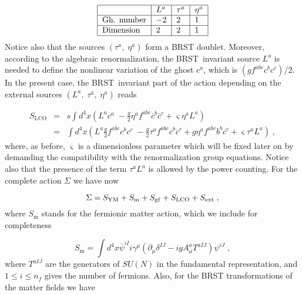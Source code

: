 \documentclass[a4paper,12pt]{article}
\begin{document}
\begin{equation}
\begin{tabular}{|l|l|l|l|}
\hline
& $L^{a}$ & $\tau ^{a}$ & $\eta ^{a}$ \\ \hline
Gh. number & $-2$ & $2$ & $1$ \\ \hline
Dimension & $2$ & $2$ & $1$ \\ \hline
\end{tabular}
\label{qltn}
\end{equation}
Notice also that the sources $\left( \tau ^{a},\;\eta ^{a}\right) $ form a
BRST doublet. Moreover, according to the algebraic renormalization, the
BRST\ invariant source $L^{a}$ is needed to define the nonlinear variation
of the ghost $c^{a}$, which is $\left( gf^{abc}c^{b}c^{c}\right) /2$. In the
present case, the BRST\ invariant part of the action depending on the
external sources $\left( L^{a},\;\tau ^{a},\;\eta ^{a}\right) $ reads

\begin{eqnarray}
S_{\mathrm{LCO}} &=&s\int d^{4}x\left( L^{a}c^{a}\;-\frac{g}{2}\eta
^{a}f^{abc}\overline{c}^{b}\overline{c}^{c}+\varsigma \eta ^{a}L^{a}\right)
\,  \label{lcogh} \\
&=&\int d^{4}x\left( L^{a}\frac{g}{2}f^{abc}c^{b}c^{c}\;-\frac{g}{2}\tau
^{a}f^{abc}\overline{c}^{b}\overline{c}^{c}+g\eta ^{a}f^{abc}b^{b}\overline{c%
}^{c}+\varsigma \tau ^{a}L^{a}\right) \;,  \nonumber
\end{eqnarray}
where, as before, $\varsigma $ is a dimensionless parameter which will be
fixed later on by demanding the compatibility with the renormalization group
equations. Notice also that the presence of the term $\tau ^{a}L^{a}$ is
allowed by the power counting. For the complete action $\Sigma $ we have now

\begin{equation}
\Sigma =S_{\mathrm{YM}}+S_{\mathrm{m}}+S_{\mathrm{gf}}+S_{\mathrm{LCO}}+S_{%
\mathrm{ext}}\;,  \label{cagh}
\end{equation}
where $S_{\mathrm{m}}$ stands for the fermionic matter action, which we
include for completeness

\begin{equation}
S_{\mathrm{m}}=\int d^{4}x\overline{\psi }^{iI}i\gamma ^{\mu }(\partial
_{\mu }\delta ^{IJ}-igA_{\mu }^{a}T^{aIJ})\psi ^{iJ}\;,  \label{mt}
\end{equation}
where $T^{aIJ}$ are the generators of $SU(N)$ in the fundamental
representation, and $1\leq i\leq n_{f}$ gives the number of fermions. Also,
for the BRST transformations of the matter fields we have
\end{document}

